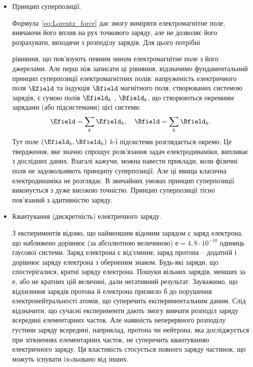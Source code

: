 \begin{itemize}
\item Принцип суперпозиції.

Формула~\eqref{eq:Lorentz_force} дає змогу виміряти
електромагнітне поле, вивчаючи його вплив на рух точкового заряду, але не
дозволяє його розрахувати, виходячи з розподілу зарядів. Для цього потрібні

рівняння, що пов’язують певним чином електромагнітне поле з його
джерелами. Але перш ніж записати ці рівняння, відзначимо фундаментальний
принцип суперпозиції електромагнітних полів: напруженість електричного
поля $\Efield$ та індукція $\Bfield$ магнітного поля, створюваних системою зарядів, є сумою
полів $\Efield_k$ , $\Bfield_k$, що створюються окремими зарядами (або підсистемами) цієї
системи:
\begin{equation}
    \Efield = \sum\limits_k \Efield_k, \quad \Bfield = \sum\limits_k \Bfield_k.
\end{equation}
 Тут поле $(\Efield_k, \Bfield_k)$ $k$-ї підсистеми розглядається окремо.
 Це твердження, яке значно спрощує розв’язання задач електродинаміки,
випливає з дослідних даних. Взагалі кажучи, можна навести приклади, коли
фізичні поля не задовольняють принципу суперпозиції. Але ці явища класична
електродинаміка не розглядає. В звичайних умовах принцип суперпозиції
виконується з дуже високою точністю. Принцип суперпозиції тісно пов’язаний
з адитивністю заряду.


\item Квантування (дискретність) електричного заряду.


З експериментів відомо, що найменшим відомим зарядом є заряд електрона, що наближено дорівнює (за абсолютною величиною) $е=4,8\cdot10^{-10}$ одиниць
гаусової системи. Заряд електрона є від’ємним; заряд протона – додатній і дорівнює заряду електрона з оберненим знаком. Будь-які заряди, що
спостерігалися, кратні заряду електрона. Пошуки вільних зарядів, менших за е, або не кратних цій величині, дали негативний результат. Зауважимо, що
відхилення зарядів протона й електрона призвело б до порушення електронейтральності атомів, що суперечить експериментальним даним. Слід відзначити, що
сучасні експерименти дають змогу вивчати розподіл заряду всередині елементарних часток. Але наявність неперервного розподілу густини заряду всередині,
наприклад, протона чи нейтрона, яка досліджується при зіткненнях елементарних часток, не суперечить квантуванню електричного заряду. Ця властивість
стосується повного заряду частинок, що можуть існувати iзoльовано від інших.



\end{itemize}
